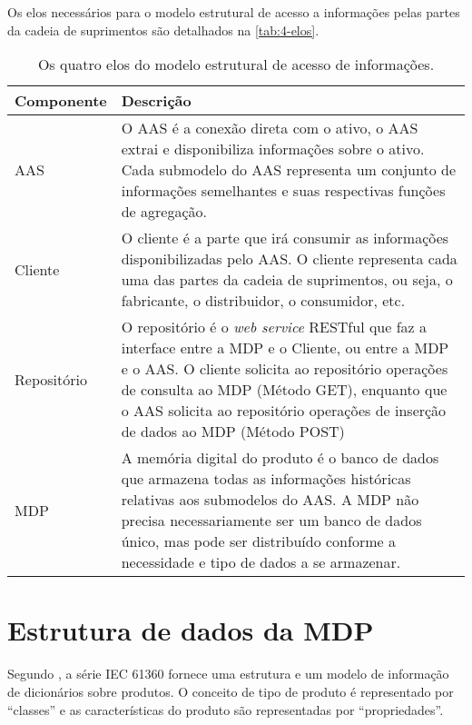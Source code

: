 	Os elos necessários para o modelo estrutural de acesso a informações pelas partes da cadeia de suprimentos são detalhados na \autoref{tab:4-elos}.
	
	\begin{table}[htb]
		\centering
		\caption{Os quatro elos do modelo estrutural de acesso de informações.}
		\label{tab:4-elos}
		\begin{tabular}{lp{12cm}}
			\hline
			\rowcolor[HTML]{F0F0F0} 
			{\color[HTML]{000000} \textbf{Componente}} 
			& {\color[HTML]{000000} \textbf{Descrição}} \\ \hline
			\rowcolor[HTML]{FFFFFF} 
			{\color[HTML]{000000} AAS}         
			& {\color[HTML]{000000} O AAS é a conexão direta com o ativo, o AAS extrai e disponibiliza informações sobre o ativo. Cada submodelo do AAS representa um conjunto de informações semelhantes e suas respectivas funções de agregação.} \\
			\rowcolor[HTML]{F7F7F7} 
			{\color[HTML]{000000} Cliente}     
			& {\color[HTML]{000000} O cliente é a parte que irá consumir as informações disponibilizadas pelo AAS. O cliente representa cada uma das partes da cadeia de suprimentos, ou seja, o fabricante, o distribuidor, o consumidor, etc. }  \\
			\rowcolor[HTML]{FFFFFF} 
			{\color[HTML]{000000} Repositório}
			& {\color[HTML]{000000} O repositório é o \textit{web service} RESTful que faz a interface entre a MDP e o Cliente, ou entre a MDP e o AAS. O cliente solicita ao repositório operações de consulta ao MDP (Método GET), enquanto que o AAS solicita ao repositório operações de inserção de dados ao MDP (Método POST)}        \\
			\rowcolor[HTML]{F7F7F7} 
			{\color[HTML]{000000} MDP}
			& {\color[HTML]{000000} A memória digital do produto é o banco de dados que armazena todas as informações históricas relativas aos submodelos do AAS. A MDP não precisa necessariamente ser um banco de dados único, mas pode ser distribuído conforme a necessidade e tipo de dados a se armazenar.}       
		\end{tabular}
	\end{table}
	
\section{Estrutura de dados da MDP}

	Segundo , a série IEC 61360 fornece uma estrutura e um modelo de informação de dicionários sobre produtos. O conceito de tipo de produto é representado por ``classes'' e as características do produto são representadas por ``propriedades''.

